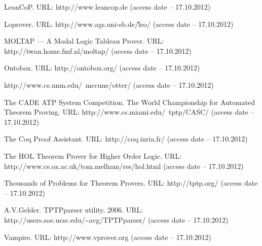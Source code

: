 \begin{thebibliography}{99}
 LeanCoP. URL: http://www.leancop.de (access date -- 17.10.2012)

 Loprover. URL: http://www.ags.uni-sb.de/\~leo/ (access date -- 17.10.2012)

 MOLTAP — A Modal Logic Tableau Prover. URL: http://twan.home.fmf.nl/moltap/ (access date -- 17.10.2012)

 Ontobox. URL: http://ontobox.org/ (access date -- 17.10.2012)

 http://www.cs.unm.edu/~mccune/otter/ (access date -- 17.10.2012)

 The CADE ATP System Competition. The World Championship for Automated Theorem Proving. URL: http://www.cs.miami.edu/~tptp/CASC/ (access date -- 17.10.2012)

 The Coq Proof Assistant. URL: http://coq.inria.fr/ (access date -- 17.10.2012)

 The HOL Theorem Prover for Higher Order Logic. URL: http://www.cs.ox.ac.uk/tom.melham/res/hol.html (access date -- 17.10.2012)

 Thousands of Problems for Theorem Provers. URL: http://tptp.org/ (access date -- 17.10.2012)

 A.V.Gelder. TPTPparser utility. 2006. URL: http://users.soe.ucsc.edu/\~{}avg/TPTPparser/ (access date -- 17.10.2012)

 Vampire. URL: http://www.vprover.org (access date -- 17.10.2012)








\end{thebibliography}



